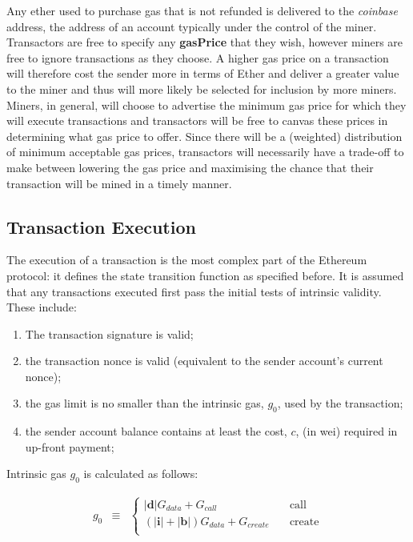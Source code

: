 \documentclass[9pt,oneside]{amsart}
\begin{document}
\begin{multicols}{2}
Any ether used to purchase gas that is not refunded is delivered to the \textit{coinbase} address, the address of an account typically under the control of the miner. Transactors are free to specify any \textbf{gasPrice} that they wish, however miners are free to ignore transactions as they choose. A higher gas price on a transaction will therefore cost the sender more in terms of Ether and deliver a greater value to the miner and thus will more likely be selected for inclusion by more miners. Miners, in general, will choose to advertise the minimum gas price for which they will execute transactions and transactors will be free to canvas these prices in determining what gas price to offer. Since there will be a (weighted) distribution of minimum acceptable gas prices, transactors will necessarily have a trade-off to make between lowering the gas price and maximising the chance that their transaction will be mined in a timely manner.


\subsection{Transaction Execution} \label{ch:execution}

The execution of a transaction is the most complex part of the Ethereum protocol: it defines the state transition function as specified before. It is assumed that any transactions executed first pass the initial tests of intrinsic validity. These include:

\begin{enumerate}
\item The transaction signature is valid;
\item the transaction nonce is valid (equivalent to the sender account's current nonce);
\item the gas limit is no smaller than the intrinsic gas, $g_0$, used by the transaction;
\item the sender account balance contains at least the cost, $c$, (in wei) required in up-front payment;
\end{enumerate}

Intrinsic gas $g_0$ is calculated as follows:

\begin{eqnarray}
g_0 & \equiv & \begin{cases}
  |\mathbf{d}| G_{data} + G_{call} & \quad \text{call} \\
  (|\mathbf{i}| + |\mathbf{b}|) G_{data} + G_{create} & \quad \text{create} \\
\end{cases}
\end{eqnarray}


\end{multicols}
\end{document}
